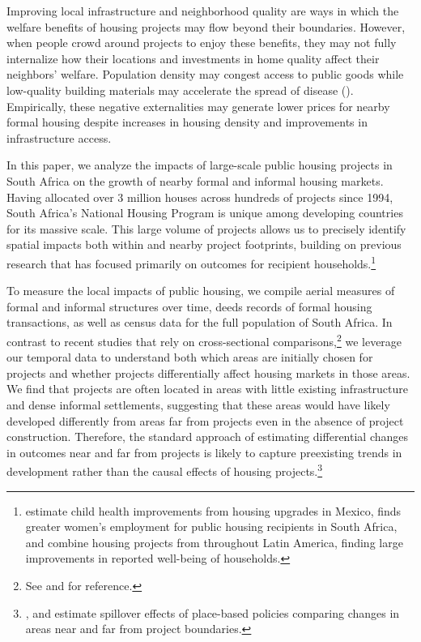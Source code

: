 \documentclass[12pt]{article}
\begin{document}
Improving local infrastructure and neighborhood quality are ways in which the welfare benefits of housing projects may flow beyond their boundaries.  However, when people crowd around projects to enjoy these benefits, they may not fully internalize how their locations and investments in home quality affect their neighbors' welfare.  Population density may congest access to public goods while low-quality building materials may accelerate the spread of disease (\cite{cattaneo2009housing}).  Empirically, these negative externalities may generate lower prices for nearby formal housing despite increases in housing density and improvements in infrastructure access.


In this paper, we analyze the impacts of large-scale public housing projects in South Africa on the growth of nearby formal and informal housing markets.  Having allocated over 3 million houses across hundreds of projects since 1994, South Africa's National Housing Program is unique among developing countries for its massive scale.  This large volume of projects allows us to precisely identify spatial impacts both within and nearby project footprints, building on previous research that has focused primarily on outcomes for recipient households.\footnote{\cite{cattaneo2009housing} estimate child health improvements from housing upgrades in Mexico, \cite{franklin2016enabled} finds greater women's employment for public housing recipients in South Africa, and \cite{galiani2017shelter} combine housing projects from throughout Latin America, finding large improvements in reported well-being of households.}  


To measure the local impacts of public housing, we compile aerial measures of formal and informal structures over time, deeds records of formal housing transactions, as well as census data for the full population of South Africa.  In contrast to recent studies that rely on cross-sectional comparisons,\footnote{See \cite{harari2018slum} and \cite{baruah2017planning} for reference.} we leverage our temporal data to understand both which areas are initially chosen for projects and whether projects differentially affect housing markets in those areas.  We find that projects are often located in areas with little existing infrastructure and dense informal settlements, suggesting that these areas would have likely developed differently from areas far from projects even in the absence of project construction.  Therefore, the standard approach of estimating differential changes in outcomes near and far from projects is likely to capture preexisting trends in development rather than the causal effects of housing projects.\footnote{\cite{rossi2010housing,hornbeck2017creative}, and \cite{diamond2016wants} estimate spillover effects of place-based policies comparing changes in areas near and far from project boundaries.}
\end{document}

